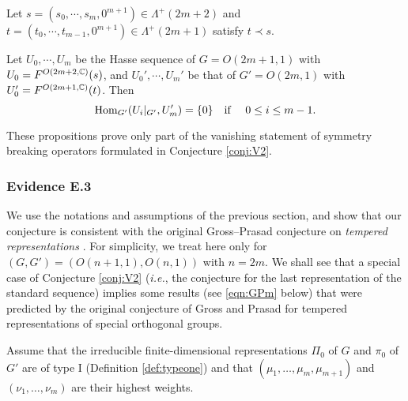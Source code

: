 Let $s=(s_0, \cdots, s_{m},0^{m+1}) \in \Lambda^+(2m+2)$
 and $t=(t_0, \cdots, t_{m-1},0^{m+1}) \in \Lambda^+(2m+1)$
 satisfy $t \prec s$.  


\begin{proposition}
\label{prop:171429}
Let $U_0, \cdots, U_m$ be the Hasse sequence of $G=O(2m+1,1)$
 with $U_0= F^{{O(2m+2,{\mathbb{C}})}}({s})$, 
 and $U_0', \cdots, U_{m}'$ be that of $G'=O(2m,1)$
 with $U_0'= F^{{O(2m+1,{\mathbb{C}})}}({t})$.  
Then 
\[
{\operatorname{Hom}}_{G'}
(U_i|_{G'}, U_m')=\{0\}
\quad
\text{if \quad $0 \le i \le m-1$.}
\]
\end{proposition}

\medskip

\begin{remark}
These propositions prove only part of the vanishing statement
 of symmetry breaking operators
 formulated in Conjecture \ref{conj:V2}.
\end{remark}


\bigskip

\noindent 
\subsubsection{Evidence E.3} 


We use the notations and assumptions
 of the previous section, 
 and show that our conjecture is consistent
 with the original 
Gross--Prasad conjecture
 on {\it{tempered representations}}
 \cite{GP}.  
For simplicity,
 we treat here 
 only for $(G, G')=(O(n+1,1), O(n,1))$
 with $n=2m$. 
We shall see that a special case
 of Conjecture \ref{conj:V2}
 ({\it{i.e.}}, the conjecture for the last representation
 of the standard sequence)
 implies some results
 (see \eqref{eqn:GPm} below)
 that were predicted by the original conjecture of Gross and Prasad
 for tempered representations of special orthogonal groups.  



Assume that the irreducible finite-dimensional representations
 $\Pi_0$ of $G$ and $\pi_0$ of $G'$
 are of type I 
 (Definition \ref{def:typeone})
 and that 
 $(\mu_1,\dots, \mu_{m}, \mu_{m+1})$ and $(\nu_1,\dots, \nu_{m})$ are their highest weights. 



